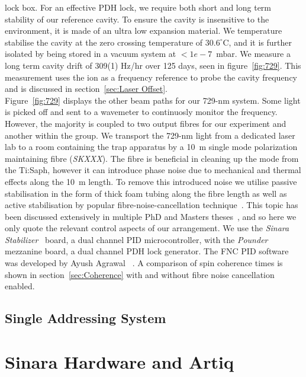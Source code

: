 \documentclass[12pt]{report}
\begin{document}
    lock box. For an effective PDH lock, we require both short and long term
    stability of our reference cavity. To ensure the cavity is insensitive to
    the environment, it is made of an ultra low expansion material. We
    temperature stabilise the cavity at the zero crossing temperature of
    $30.6^\circ$C, and it is further isolated by being stored in a vacuum system
    at $<1e-7$~mbar. We measure a long term cavity drift of 309(1) Hz/hr over
    125 days, seen in figure~\ref{fig:729}. This measurement uses the ion as a
    frequency reference to probe the cavity frequency and is discussed in
    section~\ref{sec:Laser Offset}.\\
    Figure~\ref{fig:729} displays the other beam paths for our 729-nm system.
    Some light is picked off and sent to a wavemeter to continuosly monitor the
    frequency. However, the majority is coupled to two output fibres for our
    experiment and another within the group. We transport the 729-nm light from
    a dedicated laser lab to a room containing the trap apparatus by a 10~m
    single mode polarization maintaining fibre (\emph{SKXXX}).  The fibre is
    beneficial in cleaning up the mode from the Ti:Saph, however it can
    introduce phase noise due to mechanical and thermal effects along the 10~m
    length. To remove this introduced noise we utilise passive stabilisation in
    the form of thick foam tubing along the fibre length as well as active
    stabilisation by popular fibre-noise-cancellation technique~\cite{XXX}. This
    topic has been discussed extensively in multiple PhD and Masters
    theses~\cite{XXX}, and so here we only quote the relevant control aspects of
    our arrangement. We use the \emph{Sinara Stabilizer}~\cite{XXX} board, a
    dual channel PID microcontroller, with the \emph{Pounder}~\cite{XXX}
    mezzanine board, a dual channel PDH lock generator. The FNC PID software was
    developed by Ayush Agrawal ~\cite{XXX}. A comparison of spin coherence times
    is shown in section~\ref{sec:Coherence} with and without fibre noise
    cancellation enabled. \\


\subsection{Single Addressing System}
\label{sec:Single Addressing System}

\section{Sinara Hardware and Artiq}
\label{sec:Sinara Hardware}
\end{document}
